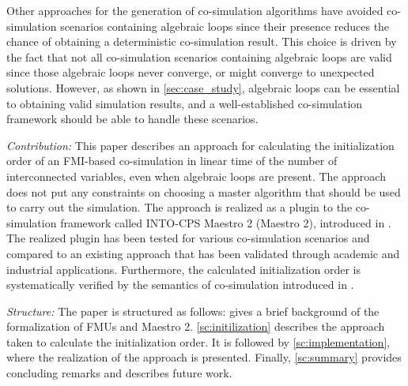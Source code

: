 Other approaches for the generation of co-simulation algorithms have avoided co-simulation scenarios containing algebraic loops since their presence reduces the chance of obtaining a deterministic co-simulation result\cite{Amalio2016CheckingCo-simulation, BromanCompositionCo-Simulation, Gomes2019c}. This choice is driven by the fact that not all co-simulation scenarios containing algebraic loops are valid since those algebraic loops never converge, or might converge to unexpected solutions. However, as shown in \cref{sec:case_study}, algebraic loops can be essential to obtaining valid simulation results, and a well-established co-simulation framework should be able to handle these scenarios. 

\textit{Contribution:} This paper describes an approach for calculating the initialization order of an FMI-based co-simulation in linear time of the number of interconnected variables, even when algebraic loops are present.
The approach does not put any constraints on choosing a master algorithm that should be used to carry out the simulation. 
The approach is realized as a plugin to the co-simulation framework called INTO-CPS Maestro 2 (Maestro 2), introduced in \cite{Thule2019b}.
The realized plugin has been tested for various co-simulation scenarios and compared to an existing approach that has been validated through academic and industrial applications. 
Furthermore, the calculated initialization order is systematically verified by the semantics of co-simulation introduced in \cite{gomes_lucio_vangheluwe_2019,Gomes2019c}. 

\textit{Structure:} The paper is structured as follows:  gives a brief background of the formalization of FMUs and Maestro 2. \cref{sc:initilization} describes the approach taken to calculate the initialization order. It is followed by \cref{sc:implementation}, where the realization of the approach is presented. Finally, \cref{sc:summary} provides concluding remarks and describes future work.
